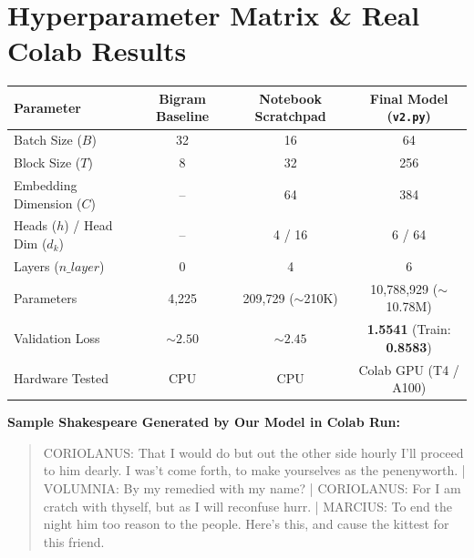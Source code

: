 \documentclass[10pt,a4paper]{article}
\begin{document}
\vspace{-0.2cm}
\section{Hyperparameter Matrix \& Real Colab Results}
\begin{center}
\small
\begin{tabular}{@{}lccc@{}}
\toprule
\textbf{Parameter} & \textbf{Bigram Baseline} & \textbf{Notebook Scratchpad} & \textbf{Final Model (\texttt{v2.py})} \\ \midrule
Batch Size ($B$) & 32 & 16 & 64 \\
Block Size ($T$) & 8 & 32 & 256 \\
Embedding Dimension ($C$) & -- & 64 & 384 \\
Heads ($h$) / Head Dim ($d_k$) & -- & 4 / 16 & 6 / 64 \\
Layers ($n\_layer$) & 0 & 4 & 6 \\
Parameters & 4,225 & 209,729 ($\sim$210K) & 10,788,929 ($\sim$10.78M) \\
Validation Loss & $\sim 2.50$ & $\sim 2.45$ & \textbf{1.5541} (Train: \textbf{0.8583}) \\
Hardware Tested & CPU & CPU & Colab GPU (T4 / A100) \\ \bottomrule
\end{tabular}
\end{center}

\textbf{Sample Shakespeare Generated by Our Model in Colab Run:}
\begin{quote}
\scriptsize\ttfamily
CORIOLANUS: That I would do but out the other side hourly I'll proceed to him dearly. I was't come forth, to make yourselves as the penenyworth. | VOLUMNIA: By my remedied with my name? | CORIOLANUS: For I am cratch with thyself, but as I will reconfuse hurr. | MARCIUS: To end the night him too reason to the people. Here's this, and cause the kittest for this friend.
\end{quote}
\end{document}
